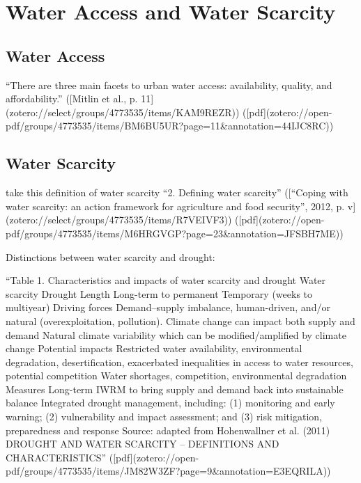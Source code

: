 {\section{Water Access and Water Scarcity}

\subsection{Water Access}
“There are three main facets to urban water access: availability, quality, and affordability.” ([Mitlin et al., p. 11](zotero://select/groups/4773535/items/KAM9REZR)) ([pdf](zotero://open-pdf/groups/4773535/items/BM6BU5UR?page=11&annotation=44IJC8RC))


\subsection{Water Scarcity}

take this definition of water scarcity
“2. Defining water scarcity” ([“Coping with water scarcity: an action framework for agriculture and food security”, 2012, p. v](zotero://select/groups/4773535/items/R7VEIVF3)) ([pdf](zotero://open-pdf/groups/4773535/items/M6HRGVGP?page=23&annotation=JFSBH7ME))


Distinctions between water scarcity and drought:

“Table 1. Characteristics and impacts of water scarcity and drought Water scarcity Drought Length Long-term to permanent Temporary (weeks to multiyear) Driving forces Demand–supply imbalance, human-driven, and/or natural (overexploitation, pollution). Climate change can impact both supply and demand Natural climate variability which can be modified/amplified by climate change Potential impacts Restricted water availability, environmental degradation, desertification, exacerbated inequalities in access to water resources, potential competition Water shortages, competition, environmental degradation Measures Long-term IWRM to bring supply and demand back into sustainable balance Integrated drought management, including: (1) monitoring and early warning; (2) vulnerability and impact assessment; and (3) risk mitigation, preparedness and response Source: adapted from Hohenwallner et al. (2011) DROUGHT AND WATER SCARCITY – DEFINITIONS AND CHARACTERISTICS” ([pdf](zotero://open-pdf/groups/4773535/items/JM82W3ZF?page=9&annotation=E3EQRILA))

}
